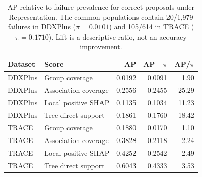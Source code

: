 \begin{table}[!tbp]\centering\footnotesize
\caption{AP relative to failure prevalence for correct proposals under Representation. The common populations contain 20/1,979 failures in DDXPlus ($\pi=0.0101$) and 105/614 in TRACE ($\pi=0.1710$). Lift is a descriptive ratio, not an accuracy improvement.}
\label{tab:ap-prevalence-reference}
\begin{tabular}{llrrr}\toprule
Dataset & Score & AP & AP $-\pi$ & AP/$\pi$\\\midrule
DDXPlus & Group coverage & 0.0192 & 0.0091 & 1.90 \\
DDXPlus & Association coverage & 0.2556 & 0.2455 & 25.29 \\
DDXPlus & Local positive SHAP & 0.1135 & 0.1034 & 11.23 \\
DDXPlus & Tree direct support & 0.1861 & 0.1760 & 18.42 \\
TRACE & Group coverage & 0.1880 & 0.0170 & 1.10 \\
TRACE & Association coverage & 0.3828 & 0.2118 & 2.24 \\
TRACE & Local positive SHAP & 0.4252 & 0.2542 & 2.49 \\
TRACE & Tree direct support & 0.6043 & 0.4333 & 3.53 \\
\bottomrule\end{tabular}\end{table}
